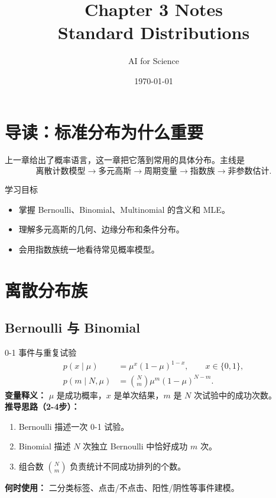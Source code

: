 \documentclass[11pt]{article}
\title{Chapter 3 Notes\\\large Standard Distributions}
\author{AI for Science}
\date{\today}
\begin{document}
\maketitle
\tableofcontents
\newpage

\section{导读：标准分布为什么重要}
上一章给出了概率语言，这一章把它落到常用的具体分布。主线是
\[
\text{离散计数模型} \rightarrow \text{多元高斯} \rightarrow \text{周期变量} \rightarrow \text{指数族} \rightarrow \text{非参数估计}.
\]

\begin{insightbox}{学习目标}
\begin{itemize}[leftmargin=1.6em]
  \item 掌握 Bernoulli、Binomial、Multinomial 的含义和 MLE。
  \item 理解多元高斯的几何、边缘分布和条件分布。
  \item 会用指数族统一地看待常见概率模型。
\end{itemize}
\end{insightbox}

\section{离散分布族}
\subsection{Bernoulli 与 Binomial}
\begin{formulabox}{0-1 事件与重复试验}
\begin{align}
p(x\mid\mu)&=\mu^x(1-\mu)^{1-x},\qquad x\in\{0,1\},\\
p(m\mid N,\mu)&=\binom{N}{m}\mu^m(1-\mu)^{N-m}.
\end{align}
\textbf{变量释义：} $\mu$ 是成功概率，$x$ 是单次结果，$m$ 是 $N$ 次试验中的成功次数。\\
\textbf{推导思路（2-4步）：}
\begin{enumerate}[leftmargin=1.6em]
  \item Bernoulli 描述一次 0-1 试验。
  \item Binomial 描述 $N$ 次独立 Bernoulli 中恰好成功 $m$ 次。
  \item 组合数 $\binom{N}{m}$ 负责统计不同成功排列的个数。
\end{enumerate}
\textbf{何时使用：} 二分类标签、点击/不点击、阳性/阴性等事件建模。
\end{formulabox}
\end{document}
